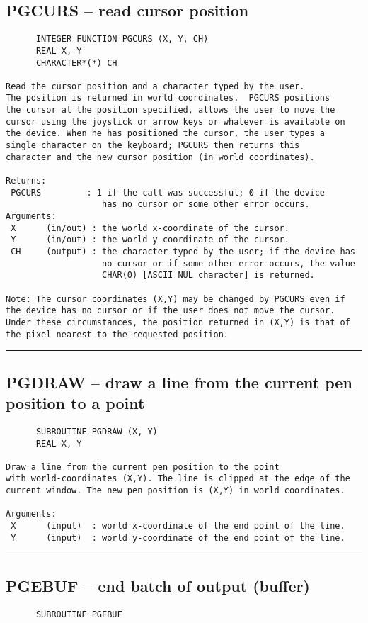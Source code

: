 {\subsection*{PGCURS -- read cursor position }
\begin{verbatim}
      INTEGER FUNCTION PGCURS (X, Y, CH)
      REAL X, Y
      CHARACTER*(*) CH

Read the cursor position and a character typed by the user.
The position is returned in world coordinates.  PGCURS positions
the cursor at the position specified, allows the user to move the
cursor using the joystick or arrow keys or whatever is available on
the device. When he has positioned the cursor, the user types a
single character on the keyboard; PGCURS then returns this
character and the new cursor position (in world coordinates).

Returns:
 PGCURS         : 1 if the call was successful; 0 if the device
                   has no cursor or some other error occurs.
Arguments:
 X      (in/out) : the world x-coordinate of the cursor.
 Y      (in/out) : the world y-coordinate of the cursor.
 CH     (output) : the character typed by the user; if the device has
                   no cursor or if some other error occurs, the value
                   CHAR(0) [ASCII NUL character] is returned.

Note: The cursor coordinates (X,Y) may be changed by PGCURS even if
the device has no cursor or if the user does not move the cursor.
Under these circumstances, the position returned in (X,Y) is that of
the pixel nearest to the requested position.
\end{verbatim}
\hrule


\subsection*{PGDRAW -- draw a line from the current pen position to a point }
\begin{verbatim}
      SUBROUTINE PGDRAW (X, Y)
      REAL X, Y

Draw a line from the current pen position to the point
with world-coordinates (X,Y). The line is clipped at the edge of the
current window. The new pen position is (X,Y) in world coordinates.

Arguments:
 X      (input)  : world x-coordinate of the end point of the line.
 Y      (input)  : world y-coordinate of the end point of the line.
\end{verbatim}
\hrule


\subsection*{PGEBUF -- end batch of output (buffer) }
\begin{verbatim}
      SUBROUTINE PGEBUF


\end{verbatim}}
